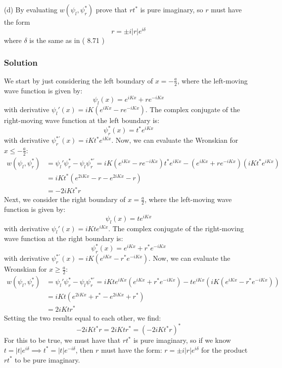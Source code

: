\documentclass[12pt]{article}
\begin{document}
\subsection{}
(d) By evaluating $w\left(\psi_l, \psi_r^*\right)$ prove that $r t^*$ is pure imaginary, so $r$ must have the form
$$
r= \pm i|r| e^{i \delta}
$$
where $\delta$ is the same as in ( 8.71 )
\subsubsection{Solution}
We start by just considering the left boundary of $x = -\frac{a}{2}$, where the left-moving wave function is given by:
\begin{equation}
    \psi_l(x) = e^{iKx} + re^{-iKx}
\end{equation}
with derivative $\psi_l'(x) = iK\left(e^{iKx} - re^{-iKx}\right)$. The complex conjugate of the right-moving wave function at the left boundary is:
\begin{equation}
    \psi_r^*(x) = t^*e^{iKx}
\end{equation}
with derivative $\psi_r^{*'}(x) = iKt^*e^{iKx}$. Now, we can evaluate the Wronskian for $x \leq -\frac{a}{2}$:
\begin{align}
    w(\psi_l, \psi_r^*) &= \psi_l'\psi_r^* - \psi_l\psi_r^{*'} = iK\left(e^{iKx} - re^{-iKx}\right)t^*e^{iKx} - \left(e^{iKx} + re^{-iKx}\right)\left(iKt^*e^{iKx}\right)\\
    &= iKt^* \left(e^{2iKx} - r - e^{2iKx} - r\right)\\
    &= -2iKt^*r
\end{align}
Next, we consider the right boundary of $x = \frac{a}{2}$, where the left-moving wave function is given by:
\begin{equation}
    \psi_l(x) = te^{iKx}
\end{equation}
with derivative $\psi_l'(x) = iKte^{iKx}$. The complex conjugate of the right-moving wave function at the right boundary is:
\begin{equation}
    \psi_r^*(x) = e^{iKx} + r^*e^{-iKx}
\end{equation}
with derivative $\psi_r^{*'}(x) = iK\left(e^{iKx} - r^*e^{-iKx}\right)$. Now, we can evaluate the Wronskian for $x \geq \frac{a}{2}$:
\begin{align}
    w(\psi_l, \psi_r^*) &= \psi_l'\psi_r^* - \psi_l\psi_r^{*'} = iKte^{iKx}\left(e^{iKx} + r^*e^{-iKx}\right) - te^{iKx}\left(iK\left(e^{iKx} - r^*e^{-iKx}\right)\right)\\
    &= iKt\left(e^{2iKx} + r^* - e^{2iKx} + r^*\right)\\
    &= 2iKtr^*
\end{align}
Setting the two results equal to each other, we find:
\begin{equation}
    -2iKt^*r = 2iKtr^* = \left(-2iKt^*r\right)^*
\end{equation}
For this to be true, we must have that $r t^*$ is pure imaginary, so if we know $t = |t|e^{i\delta} \implies t^* = |t|e^{-i\delta}$, then $r$ must have the form: $r = \pm i|r|e^{i\delta}$ for the product $r t^*$ to be pure imaginary.
\end{document}
